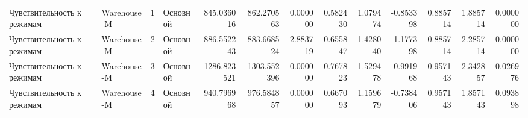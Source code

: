\begin{tabular}{llrlrrrrrrrrr}
 Чувствительность к режимам & Warehouse-M & 1 & Основной & 845.036016 & 862.270563 & 0.000000 & 0.582430 & 1.079474 & -0.853398 & 0.885714 & 1.885714 & 0.000000 \\
 Чувствительность к режимам & Warehouse-M & 2 & Основной & 886.552243 & 883.668524 & 2.883719 & 0.655847 & 1.428040 & -1.177398 & 0.885714 & 2.285714 & 0.000000 \\
 Чувствительность к режимам & Warehouse-M & 3 & Основной & 1286.823521 & 1303.552396 & 0.000000 & 0.767823 & 1.529478 & -0.991968 & 0.957143 & 2.342857 & 0.026976 \\
 Чувствительность к режимам & Warehouse-M & 4 & Основной & 940.796968 & 976.584857 & 0.000000 & 0.667093 & 1.159679 & -0.738406 & 0.957143 & 1.857143 & 0.093898 \\
\bottomrule
\end{tabular}
